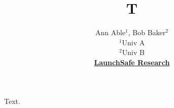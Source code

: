 \documentclass{article}
\title{T}
\author{Ann Able$^1$, Bob Baker$^2$ \\ $^1$Univ A \\ $^2$Univ B \\ \href{https://launchsafe.com}{\textbf{LaunchSafe Research}}}
\begin{document}
\maketitle
Text.
\end{document}
